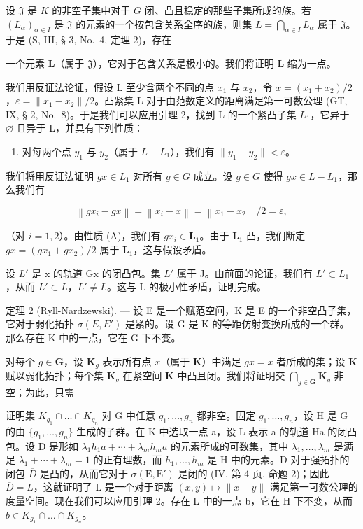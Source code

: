设 \(\mathfrak{J}\) 是 \(K\) 的非空子集中对于 \(G\) 闭、凸且稳定的那些子集所成的族。若 \((L_{\alpha})_{\alpha \in I}\) 是 \(\mathfrak{J}\) 的元素的一个按包含关系全序的族，则集 \(L = \bigcap_{\alpha \in I} L_{\alpha}\) 属于 \(\mathfrak{J}\)。于是 (S, III, § 3, No.~4, 定理 2)，存在

一个元素 \(\mathbf{L}\)（属于 \(\mathfrak{J}\)），它对于包含关系是极小的。我们将证明 \(\mathbf{L}\) 缩为一点。

我们用反证法论证，假设 L 至少含两个不同的点 \(x_{1}\) 与 \(x_{2}\)，令 \(x = (x_{1} + x_{2})/2\)，\(\varepsilon = \|x_{1} - x_{2}\|/2\)。凸紧集 L 对于由范数定义的距离满足第一可数公理 (GT, IX, § 2, No.~8)。于是我们可以应用引理 2，找到 L 的一个紧凸子集 \(L_{1}\)，它异于 \(\varnothing\) 且异于 L，并具有下列性质：

\begin{enumerate}
\def\labelenumi{(\Alph{enumi})}
\tightlist
\item
  对每两个点 \(y_{1}\) 与 \(y_{2}\)（属于 \(L - L_{1}\)），我们有 \(\|y_{1} - y_{2}\| < \varepsilon\)。
\end{enumerate}

我们将用反证法证明 \(gx \in L_{1}\) 对所有 \(g \in G\) 成立。设 \(g \in G\) 使得 \(gx \in L - L_{1}\)，那么我们有

\[
\left\| g x _ {i} - g x \right\| = \left\| x _ {i} - x \right\| = \left\| x _ {1} - x _ {2} \right\| / 2 = \varepsilon ,
\]

（对 \(i = 1, 2\)）。由性质 (A)，我们有 \(gx_{i} \in \mathbf{L}_{1}\)。由于 \(\mathbf{L}_{1}\) 凸，我们断定 \(gx = (gx_{1} + gx_{2}) / 2\) 属于 \(\mathbf{L}_{1}\)，这与假设矛盾。

设 \(L'\) 是 x 的轨道 Gx 的闭凸包。集 \(L'\) 属于 J。由前面的论证，我们有 \(L' \subset L_1\)，从而 \(L' \subset L\)，\(L' \neq L\)。这与 L 的极小性矛盾，证明完成。

定理 2 (Ryll-Nardzewski). --- 设 E 是一个赋范空间，K 是 E 的一个非空凸子集，它对于弱化拓扑 \(\sigma(E, E')\) 是紧的。设 G 是 K 的等距仿射变换所成的一个群。那么存在 K 中的一点，它在 G 下不变。

对每个 \(g \in \mathbf{G}\)，设 \(\mathbf{K}_g\) 表示所有点 \(x\)（属于 \(\mathbf{K}\)）中满足 \(gx = x\) 者所成的集；设 \(\mathbf{K}\) 赋以弱化拓扑；每个集 \(\mathbf{K}_g\) 在紧空间 \(\mathbf{K}\) 中凸且闭。我们将证明交 \(\bigcap_{g \in \mathbf{G}} \mathbf{K}_g\) 非空；为此，只需

证明集 \(K_{g_{1}} \cap \ldots \cap K_{g_{n}}\) 对 G 中任意 \(g_{1}, \ldots, g_{n}\) 都非空。固定 \(g_{1}, \ldots, g_{n}\)，设 H 是 G 的由 \(\{g_{1}, \ldots, g_{n}\}\) 生成的子群。在 K 中选取一点 a，设 L 表示 a 的轨道 Ha 的闭凸包。设 D 是形如 \(\lambda_{1}h_{1}a + \cdots + \lambda_{m}h_{m}a\) 的元素所成的可数集，其中 \(\lambda_{1}, \ldots, \lambda_{m}\) 是满足 \(\lambda_{1} + \cdots + \lambda_{m} = 1\) 的正有理数，而 \(h_{1}, \ldots, h_{m}\) 是 H 中的元素。D 对于强拓扑的闭包 \(\overline{D}\) 是凸的，从而它对于 \(\sigma(\mathrm{E}, \mathrm{E}')\) 是闭的 (IV, 第 4 页, 命题 2)；因此 \(\overline{D} = L\)，这就证明了 L 是一个对于距离 \((x, y) \mapsto \|x - y\|\) 满足第一可数公理的度量空间。现在我们可以应用引理 2。存在 L 中的一点 b，它在 H 下不变，从而 \(b \in K_{g_{1}} \cap \ldots \cap K_{g_{n}}\)。

